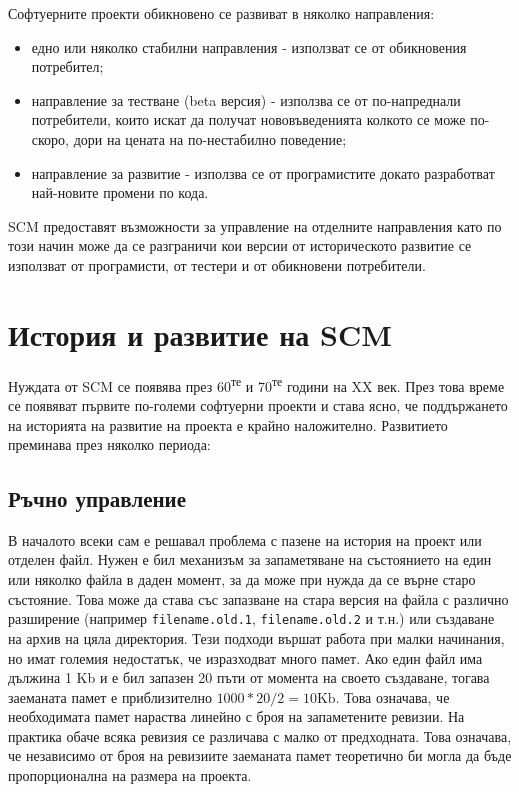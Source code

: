 \documentclass[a4paper]{article}
\begin{document}
Софтуерните проекти обикновено се развиват в няколко направления:
\begin{itemize}
  \item едно или няколко стабилни направления - използват се от обикновения
  потребител;
  \item направление за тестване (beta версия) - използва се от по-напреднали
  потребители, които искат да получат нововъведенията колкото се може по-скоро,
  дори на цената на по-нестабилно поведение;
  \item направление за развитие - използва се от програмистите докато
  разработват най-новите промени по кода.
\end{itemize}


SCM предоставят възможности за управление на отделните направления като по
този начин може да се разграничи кои версии от историческото развитие се
използват от програмисти, от тестери и от обикновени потребители.

\section{История и развитие на SCM}
Нуждата от SCM се появява през 60\textsuperscript{те} и
70\textsuperscript{те} години на XX век. През
това време се появяват първите по-големи софтуерни проекти и става ясно, че
поддържането на историята на развитие на проекта е крайно наложително.
Развитието преминава през няколко периода:
  \subsection{Ръчно управление}
  В началото всеки сам е решавал проблема с пазене на история на проект или
  отделен файл. Нужен е бил механизъм за запаметяване на състоянието на един
  или няколко файла в даден момент, за да може при нужда да се върне старо
  състояние. Това може да става със запазване на стара версия на файла с
  различно разширение (например \texttt{filename.old.1},
  \texttt{filename.old.2} и т.н.) или създаване на архив на цяла директория.
  Тези подходи вършат работа при малки начинания, но имат големия недостатък, че
  изразходват много памет. Ако един файл има дължина 1 Kb и е бил запазен 20
  пъти от момента на своето създаване, тогава заеманата памет е приблизително
  $1000 * 20 / 2 = 10 \mathrm{Kb}$. Това означава, че необходимата памет нараства
  линейно с броя на запаметените ревизии. На практика обаче всяка
  ревизия се различава с малко от предходната. Това означава, че независимо от
  броя на ревизиите заеманата памет теоретично би могла да бъде пропорционална 
  на размера на проекта.
\end{document}
